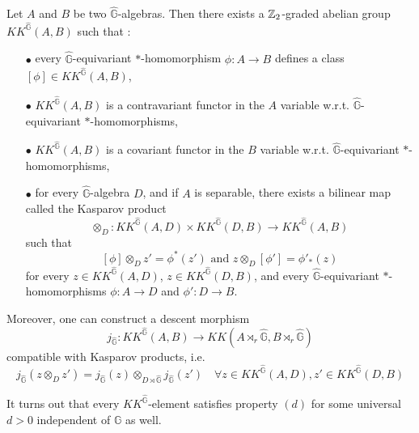 \begin{prop}
Let $A$ and $B$ be two $\hat{\mathbb G}$-algebras. Then there exists a $\mathbb Z_2$-graded abelian group $KK^{\hat{\mathbb G}}(A,B) $ such that :
\begin{itemize}
\item[$\bullet$] every $\hat{\mathbb G}$-equivariant $*$-homomorphism $\phi : A\rightarrow B$ defines a class $[\phi]\in KK^{\hat{\mathbb G}}(A,B)$,
\item[$\bullet$] $KK^{\hat{\mathbb G}}(A,B)$ is a contravariant functor in the $A$ variable w.r.t. $\hat{\mathbb G}$-equivariant $*$-homomorphisms,
\item[$\bullet$] $KK^{\hat{\mathbb G}}(A,B)$ is a covariant functor in the $B$ variable w.r.t. $\hat{\mathbb G}$-equivariant $*$-homomorphisms,
\item[$\bullet$] for every $\hat{\mathbb G}$-algebra $D$, and if $A$ is separable, there exists a bilinear map called the Kasparov product 
\[\otimes_D : KK^{\hat{\mathbb G}}(A,D)\times KK^{\hat{\mathbb G}}(D,B)  \rightarrow  KK^{\hat{\mathbb G}}(A,B)\]
such that 
\[ [\phi]\otimes_D z' = \phi^*(z') \text{ and } z\otimes_D[\phi'] = \phi'_*(z)\]
for every $z\in KK^{\hat{\mathbb G}}(A,D)$, $z\in KK^{\hat{\mathbb G}}(D,B)$, and every $\hat{\mathbb G}$-equivariant $*$-homomorphisms $\phi : A \rightarrow D$ and $\phi' : D\rightarrow B$.
\end{itemize}
Moreover, one can construct a descent morphism
\[j_{\hat{\mathbb G}} : KK^{\hat{\mathbb G}}(A,B)\rightarrow KK(A\rtimes_r \hat{\mathbb G},B\rtimes_r \hat{\mathbb G})\]
compatible with Kasparov products, i.e. 
\[j_{\hat{\mathbb G}}(z\otimes_D z') = j_{\hat{\mathbb G}}(z)\otimes_{D\rtimes \hat{\mathbb G}} j_{\hat{\mathbb G}}(z')\quad \forall z\in KK^{\hat{\mathbb G}}(A,D),z'\in KK^{\hat{\mathbb G}}(D,B) \]
\end{prop}

It turns out that every $KK^{\hat{\mathbb G}}$-element satisfies property $(d)$ for some universal $d>0$ independent of $\mathbb G$ as well.































